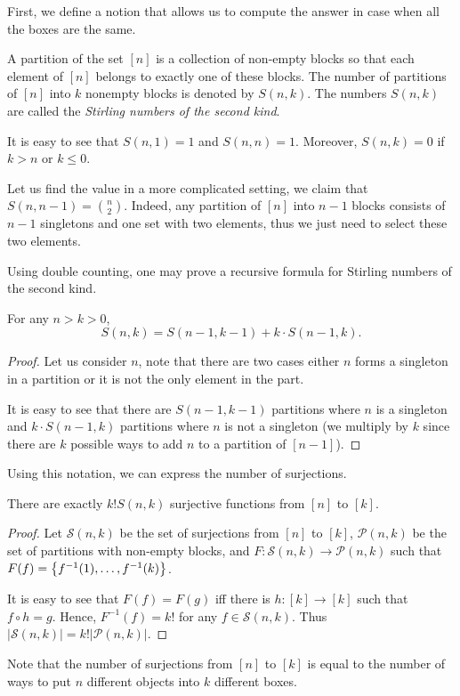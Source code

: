 First, we define a notion that allows us to compute the answer in case when
all the boxes are the same.
\begin{definition}
  A partition of the set $[n]$ is a collection of non-empty
  blocks so that each element of $[n]$ belongs to exactly
  one of these blocks. The number of partitions of $[n]$
  into $k$ nonempty blocks is denoted by $S(n, k)$.
  The numbers $S(n, k)$ are called the \emph{Stirling numbers
  of the second kind}.
\end{definition}

It is easy to see that $S(n, 1) = 1$ and $S(n, n) = 1$.
Moreover, $S(n, k) = 0$ if $k > n$ or $k \le 0$.

Let us find the value in a more complicated setting, we
claim that $S(n, n - 1) = \binom{n}{2}$. Indeed, any
partition of $[n]$ into $n - 1$ blocks consists of
$n - 1$ singletons and one set with two elements, thus we
just need to select these two elements.

Using double counting, one may prove a recursive formula
for Stirling numbers of the second kind.
\begin{theorem}
  For any $n > k > 0$,
  \[
    S(n, k) = S(n - 1, k - 1) + k \cdot S(n - 1, k).
  \]
\end{theorem}
\begin{proof}
  Let us consider $n$, note that there are two cases either $n$ forms a
  singleton in a partition or it is not the only element in the part.

  It is easy to see that there are $S(n - 1, k - 1)$ partitions where $n$ is
  a singleton and $k \cdot S(n - 1, k)$ partitions where $n$ is not a singleton
  (we multiply by $k$ since there are $k$ possible ways to add $n$ to a
  partition of $[n - 1]$).
\end{proof}

Using this notation, we can express the number of surjections.
\begin{lemma}
  There are exactly $k! S(n, k)$ surjective functions from
  $[n]$ to $[k]$.
\end{lemma}
\begin{proof}
  Let $\mathcal{S}(n, k)$ be the set of surjections from $[n]$ to $[k]$,
  $\mathcal{P}(n, k)$ be the set of partitions with non-empty blocks, and
  $F : \mathcal{S}(n, k) \to \mathcal{P}(n, k)$ such that
  $F(f) = \set{f^{-1}(1), \dots, f^{-1}(k)}$.

  It is easy to see that $F(f) = F(g)$ iff there is $h : [k] \to [k]$ such that
  $f \circ h = g$. Hence, $F^{-1}(f) = k!$ for any $f \in \mathcal{S}(n, k)$.
  Thus $|\mathcal{S}(n, k)| = k! |\mathcal{P}(n, k)|$.
\end{proof}
Note that the number of surjections from $[n]$ to $[k]$ is equal to the
number of ways to put $n$ different objects into $k$ different boxes.

